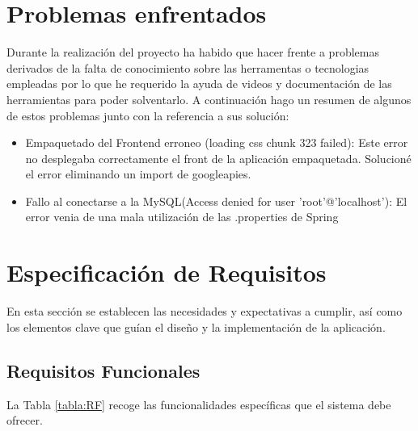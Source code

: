 \section{Problemas enfrentados}
Durante la realización del proyecto ha habido que hacer frente a problemas derivados de la falta de conocimiento sobre las herramentas o tecnologias empleadas
por lo que he requerido la ayuda de videos y documentación de las herramientas para poder solventarlo. A continuación hago un resumen de algunos de estos problemas junto con la referencia a sus solución:
\begin{itemize}
    \item  Empaquetado del Frontend erroneo (loading css chunk 323 failed)\cite{cssChunk}: Este error no desplegaba correctamente el front de la aplicación empaquetada.
     Solucioné el error eliminando un import de googleapies.
    \item  Fallo al conectarse a la MySQL(Access denied for user 'root'@'localhost')\cite{mysql}: El error venia de una mala utilización de las .properties de 
     Spring 
\end{itemize}



\section{Especificación de Requisitos}
En esta sección se establecen las necesidades y expectativas a cumplir, así como los elementos clave que guían el diseño y la implementación de la aplicación.
\newpage
\subsection{Requisitos Funcionales}
La Tabla \ref{tabla:RF} recoge las funcionalidades específicas que el sistema debe ofrecer.

